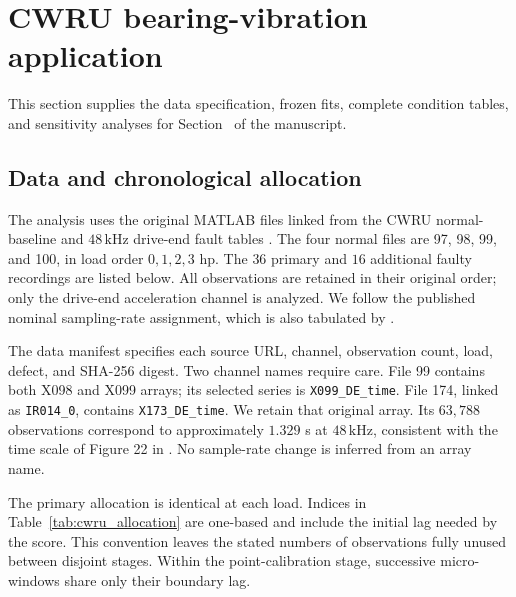 \documentclass[11pt]{article}
\makeatletter
\DeclareRobustCommand{\MainRef}[2]{\hyper@linkfile{#2}{main.pdf}{#1}}
\theoremstyle{definition}
\theoremstyle{remark}
\newcommand{\1}{\mathbf 1}
\makeatother
\begin{document}
\FloatBarrier\clearpage
\section{CWRU bearing-vibration application}\label{app:cwru}\hypertarget{app:cwru}{}

This section supplies the data specification, frozen fits, complete condition tables, and sensitivity analyses for Section~\MainRef{main:cwru}{9} of the manuscript.

\subsection{Data and chronological allocation}
\label{app:cwru_data}

The analysis uses the original MATLAB files linked from the CWRU normal-baseline and \(48\,\mathrm{kHz}\) drive-end fault tables \citep{cwruData2026}. The four normal files are 97, 98, 99, and 100, in load order \(0,1,2,3\) hp. The \(36\) primary and \(16\) additional faulty recordings are listed below. All observations are retained in their original order; only the drive-end acceleration channel is analyzed. We follow the published nominal sampling-rate assignment, which is also tabulated by \citet{smithRandall2015}.

The data manifest specifies each source URL, channel, observation count, load, defect, and SHA-256 digest. Two channel names require care. File 99 contains both X098 and X099 arrays; its selected series is \texttt{X099\_DE\_time}. File 174, linked as \texttt{IR014\_0}, contains \texttt{X173\_DE\_time}. We retain that original array. Its \(63{,}788\) observations correspond to approximately \(1.329\) s at \(48\,\mathrm{kHz}\), consistent with the time scale of Figure 22 in \citet{smithRandall2015}. No sample-rate change is inferred from an array name.

The primary allocation is identical at each load. Indices in Table~\ref{tab:cwru_allocation} are one-based and include the initial lag needed by the score. This convention leaves the stated numbers of observations fully unused between disjoint stages. Within the point-calibration stage, successive micro-windows share only their boundary lag.
\end{document}
